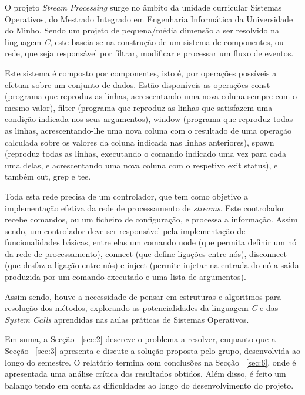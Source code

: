 \documentclass[a4paper]{article}
\begin{document}
\hspace{3mm} O projeto \emph{Stream Processing} surge no âmbito da unidade curricular Sistemas Operativos, do Mestrado Integrado em Engenharia Informática da Universidade do Minho. Sendo um projeto de pequena/média dimensão a ser resolvido na linguagem \emph{C}, este baseia-se na construção de um sistema de componentes, ou rede, que seja responsável por filtrar, modificar e processar um fluxo de eventos.
\par Este sistema é composto por componentes, isto é, por operações possíveis a efetuar sobre um conjunto de dados. Estão disponíveis as operações const (programa que reproduz as linhas, acrescentando uma nova coluna sempre com o mesmo valor), filter (programa que reproduz as linhas que satisfazem uma condição indicada nos seus argumentos), window (programa que reproduz todas as linhas, acrescentando-lhe uma nova coluna com o resultado de uma operação calculada sobre os valores da coluna indicada nas linhas anteriores), spawn (reproduz todas as linhas, executando o comando indicado uma vez para cada uma delas, e acrescentando uma nova coluna com o respetivo exit status), e também cut, grep e tee.
\par Toda esta rede precisa de um controlador, que tem como objetivo a implementação efetiva da rede de processamento de \emph{streams}. Este controlador recebe comandos, ou um ficheiro de configuração, e processa a informação. Assim sendo, um controlador deve ser responsável pela implementação de funcionalidades básicas, entre elas um comando node (que permita definir um nó da rede de processamento), connect (que define ligações entre nós), disconnect (que desfaz a ligação entre nós) e inject (permite injetar na entrada do nó a saída produzida por um comando executado e uma lista de argumentos).
\par Assim sendo, houve a necessidade de pensar em estruturas e algoritmos para resolução dos métodos, explorando as potencialidades da linguagem \emph{C} e das \emph{System Calls} aprendidas nas aulas práticas de Sistemas Operativos. 
\par Em suma, a Secção ~\ref{sec:2} descreve o problema a resolver, enquanto que a Secção ~\ref{sec:3} apresenta e discute a solução proposta pelo grupo, desenvolvida ao longo do semestre. O relatório termina com conclusões na  Secção ~\ref{sec:6}, onde é apresentada uma análise crítica dos resultados obtidos. Além disso, é feito um balanço tendo em conta as dificuldades ao longo do desenvolvimento do projeto.
\end{document}
